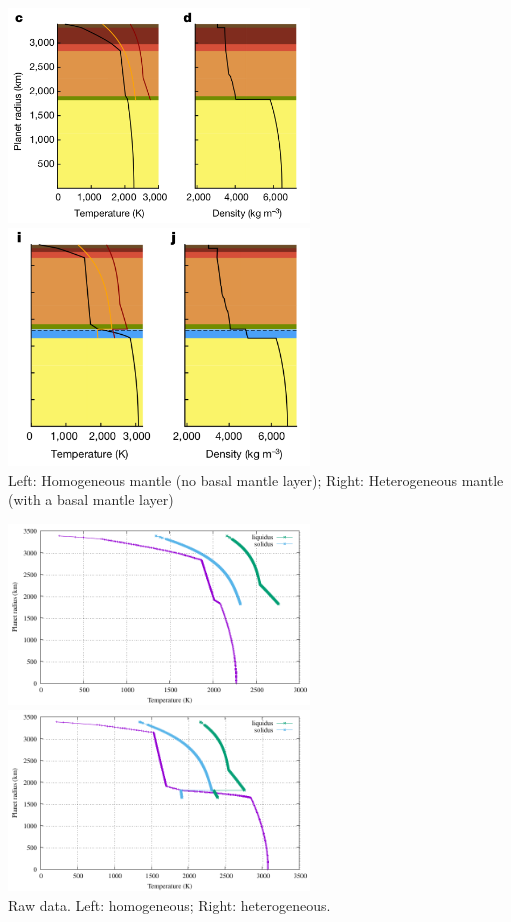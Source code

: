 \begin{itemize}
\begin{center}
\includegraphics[width=8cm]{images/mars/temperature/sadr23_a}
\includegraphics[width=8cm]{images/mars/temperature/sadr23_b}\\
{\captionfont 
Left: Homogeneous mantle (no basal mantle layer); 
Right: Heterogeneous mantle (with a basal mantle layer)}
\end{center}

\begin{center}
\includegraphics[width=8cm]{images/mars/temperature/sadr23_fig1c/T.pdf}
\includegraphics[width=8cm]{images/mars/temperature/sadr23_fig1i/T.pdf}\\
{\captionfont Raw data. Left: homogeneous; Right: heterogeneous.}
\end{center} 



\end{itemize}
